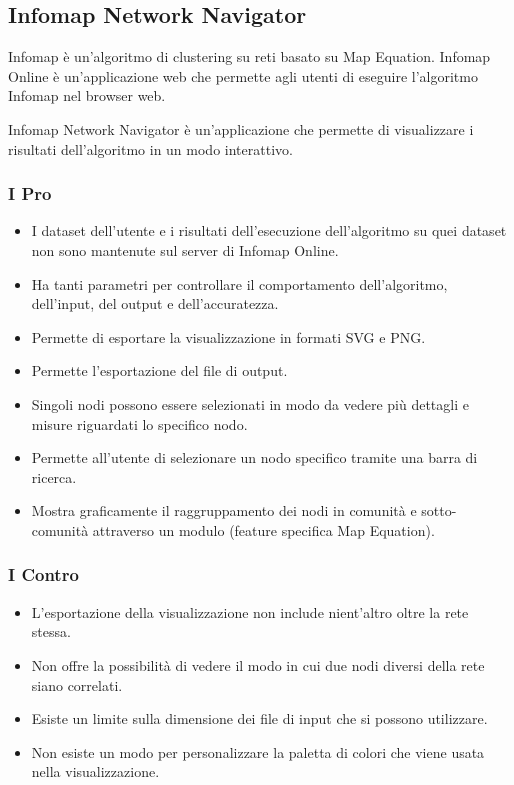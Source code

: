 \documentclass[a4paper,12pt]{report}
\begin{document}
		\subsection{Infomap Network Navigator}
		Infomap è un'algoritmo di clustering su reti basato su Map Equation. Infomap Online è un'applicazione web che permette agli utenti di eseguire l'algoritmo Infomap nel browser web. \cite{mapequationsite} 
		
		Infomap Network Navigator è un'applicazione che permette di visualizzare i risultati
		dell'algoritmo in un modo interattivo. \cite{mapequationnavigatorsite} 
		
			\subsubsection*{I Pro}
				\begin{itemize}
					\item I dataset dell'utente e i risultati dell'esecuzione dell'algoritmo su quei dataset non sono mantenute sul server di Infomap Online.
					\item Ha tanti parametri per controllare il comportamento dell'algoritmo, dell'input, del output e dell'accuratezza.
					\item Permette di esportare la visualizzazione in formati SVG e PNG.
					\item Permette l'esportazione del file di output.
					\item Singoli nodi possono essere selezionati in modo da vedere più dettagli e misure riguardati lo specifico nodo.
					\item Permette all'utente di selezionare un nodo specifico tramite una barra di ricerca.
					\item Mostra graficamente il raggruppamento dei nodi in comunità e sotto-comunità attraverso un modulo (feature specifica Map Equation).
				\end{itemize}			

			\subsubsection*{I Contro}
				\begin{itemize}
					\item L'esportazione della visualizzazione non include nient'altro oltre la rete stessa.
					\item Non offre la possibilità di vedere il modo in cui due nodi diversi della rete siano correlati.
					\item Esiste un limite sulla dimensione dei file di input che si possono utilizzare.
					\item Non esiste un modo per personalizzare la paletta di colori che viene usata nella visualizzazione.
				\end{itemize}
\end{document}
